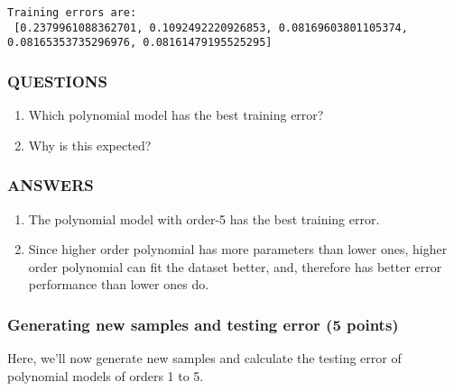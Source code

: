 \documentclass[11pt]{article}
\begin{document}
    \begin{Verbatim}[commandchars=\\\{\}]
Training errors are: 
 [0.2379961088362701, 0.1092492220926853, 0.08169603801105374, 0.08165353735296976, 0.08161479195525295]

    \end{Verbatim}

    \hypertarget{questions}{%
\subsubsection{QUESTIONS}\label{questions}}

\begin{enumerate}
\def\labelenumi{(\arabic{enumi})}
\item
  Which polynomial model has the best training error?
\item
  Why is this expected?
\end{enumerate}

    \hypertarget{answers}{%
\subsubsection{ANSWERS}\label{answers}}

\begin{enumerate}
\def\labelenumi{(\arabic{enumi})}
\item
  The polynomial model with order-5 has the best training error.
\item
  Since higher order polynomial has more parameters than lower ones,
  higher order polynomial can fit the dataset better, and, therefore has
  better error performance than lower ones do.
\end{enumerate}

    \hypertarget{generating-new-samples-and-testing-error-5-points}{%
\subsubsection{Generating new samples and testing error (5
points)}\label{generating-new-samples-and-testing-error-5-points}}

Here, we'll now generate new samples and calculate the testing error of
polynomial models of orders 1 to 5.
\end{document}
